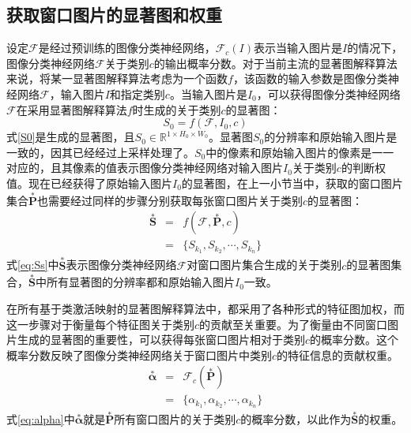 \subsection{获取窗口图片的显著图和权重}
设定$\mathcal{F}$是经过预训练的图像分类神经网络，$\mathcal{F}_c(I)$表示当输入图片是$I$的情况下，图像分类神经网络$\mathcal{F}$关于类别$c$的输出概率分数。对于当前主流的显著图解释算法来说，将某一显著图解释算法考虑为一个函数$f$，该函数的输入参数是图像分类神经网络$\mathcal{F}$，输入图片$I$和指定类别$c$。当输入图片是$I_0$，可以获得图像分类神经网络$\mathcal{F}$在采用显著图解释算法$f$时生成的关于类别$c$的显著图：
\begin{equation}
	S_0=f(\mathcal{F},I_0,c)
	\label{S0}
\end{equation}
式\ref{S0}是生成的显著图，且$S_0 \in \mathbb{R}^{1\times H_0 \times W_0}$。显著图$S_0$的分辨率和原始输入图片是一致的，因其已经经过上采样处理了。$S_0$中的像素和原始输入图片的像素是一一对应的，且其像素的值表示图像分类神经网络对输入图片$I_0$关于类别$c$的判断权值。现在已经获得了原始输入图片$I_0$的显著图，在上一小节当中，获取的窗口图片集合$\overset{*}{\bm{P}}$也需要经过同样的步骤分别获取每张窗口图片关于类别$c$的显著图：
\begin{eqnarray}
	\overset{*}{\bm{S}} &=& f(\mathcal {F}, \overset{*}{\bm{P}},c) \nonumber \\
	~ &=& \{S_{k_1},S_{k_2},\cdots,S_{k_n}\}
	\label{eq:Ss}
\end{eqnarray}
式\ref{eq:Ss}中$\overset{*}{\bm{S}}$表示图像分类神经网络$\mathcal{F}$对窗口图片集合生成的关于类别$c$的显著图集合，$\overset{*}{\bm{S}}$中所有显著图的分辨率都和原始输入图片$I_0$一致。

在所有基于类激活映射的显著图解释算法中，都采用了各种形式的特征图加权，而这一步骤对于衡量每个特征图关于类别$c$的贡献至关重要。为了衡量由不同窗口图片生成的显著图的重要性，可以获得每张窗口图片相对于类别$c$的概率分数。这个概率分数反映了图像分类神经网络关于窗口图片中类别$c$的特征信息的贡献权重。
\begin{eqnarray}
	\overset{*}{\bm{\alpha}} &=& \mathcal{F}_c(\overset{*}{\bm{P}}) \nonumber \\
	~ &=& \{\alpha_{k_1},\alpha_{k_2},\cdots,\alpha_{k_n}\}
\label{eq:alpha}
\end{eqnarray}
式\ref{eq:alpha}中$\overset{*}{\bm{\alpha}}$就是$\overset{*}{\bm{P}}$所有窗口图片的关于类别$c$的概率分数，以此作为$\overset{*}{\bm{S}}$的权重。

